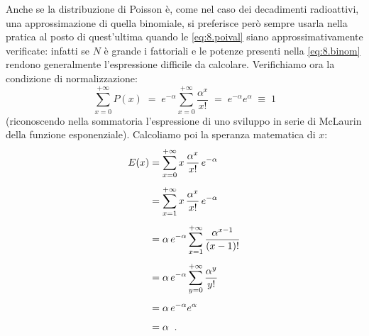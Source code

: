 Anche se la distribuzione di Poisson \`e, come nel caso dei
decadimenti radioattivi, una approssimazione di quella
binomiale, si preferisce per\`o sempre usarla nella pratica
al posto di quest'ultima quando le \eqref{eq:8.poival} siano
approssimativamente verificate: infatti se $N$ \`e grande i
fattoriali e le potenze presenti nella \eqref{eq:8.binom}
rendono generalmente l'espressione difficile da calcolare.%
Verifichiamo ora la condizione di normalizzazione:
\begin{equation*}
  \sum_{x=0}^{+ \infty} P(x) \; = \;
     e^{-\alpha} \sum_{x=0}^{+ \infty}
     \frac{\alpha^x}{x!} \; = \;
     e^{-\alpha} e^{\alpha} \; \equiv \; 1
\end{equation*}
(riconoscendo nella sommatoria l'espressione di uno sviluppo
in serie di McLaurin della funzione esponenziale).
Calcoliamo poi la speranza matematica di $x $:
\begin{align*}
  E(x) &= \sum_{x=0}^{+ \infty} x \,
  \frac{\alpha^x}{x!} \, e^{-\alpha} \\[1ex]
  &= \sum_{x=1}^{+ \infty} x \,
  \frac{\alpha^x}{x!} \, e^{-\alpha} \\[1ex]
  &= \alpha \, e^{-\alpha} \sum_{x=1}^{+ \infty}
  \frac{\alpha^{x-1}}{(x-1)!} \\[1ex]
  &= \alpha \, e^{-\alpha} \sum_{y=0}^{+ \infty}
  \frac{\alpha^y}{y!} \\[1ex]
  &= \alpha \, e^{-\alpha} e^\alpha \\[1ex]
  &= \alpha \;\; .
\end{align*}

